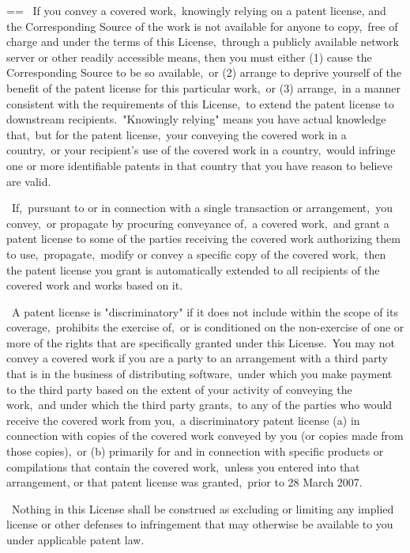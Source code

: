 \documentclass{book}
\makeatletter
\newenvironment{Texinfopreformatted}{%
  \par\GNUTobeylines\obeyspaces\frenchspacing\parskip=\z@\parindent=\z@}{}
{\catcode`\^^M=13 \gdef\GNUTobeylines{\catcode`\^^M=13 \def^^M{\null\par}}}
\newenvironment{Texinfoindented}{\begin{list}{}{}\item\relax}{\end{list}}
\renewcommand{\_}{\Texinfounderscore\discretionary{}{}{}}
\makeatother
\begin{document}
\begin{Texinfoindented}
\begin{Texinfopreformatted}
\  If you convey a covered work,\ knowingly relying on a patent license,
and the Corresponding Source of the work is not available for anyone
to copy,\ free of charge and under the terms of this License,\ through a
publicly available network server or other readily accessible means,
then you must either (1) cause the Corresponding Source to be so
available,\ or (2) arrange to deprive yourself of the benefit of the
patent license for this particular work,\ or (3) arrange,\ in a manner
consistent with the requirements of this License,\ to extend the patent
license to downstream recipients.\  "Knowingly relying" means you have
actual knowledge that,\ but for the patent license,\ your conveying the
covered work in a country,\ or your recipient's use of the covered work
in a country,\ would infringe one or more identifiable patents in that
country that you have reason to believe are valid.

\  If,\ pursuant to or in connection with a single transaction or
arrangement,\ you convey,\ or propagate by procuring conveyance of,\ a
covered work,\ and grant a patent license to some of the parties
receiving the covered work authorizing them to use,\ propagate,\ modify
or convey a specific copy of the covered work,\ then the patent license
you grant is automatically extended to all recipients of the covered
work and works based on it.

\  A patent license is "discriminatory" if it does not include within
the scope of its coverage,\ prohibits the exercise of,\ or is
conditioned on the non-exercise of one or more of the rights that are
specifically granted under this License.\  You may not convey a covered
work if you are a party to an arrangement with a third party that is
in the business of distributing software,\ under which you make payment
to the third party based on the extent of your activity of conveying
the work,\ and under which the third party grants,\ to any of the
parties who would receive the covered work from you,\ a discriminatory
patent license (a) in connection with copies of the covered work
conveyed by you (or copies made from those copies),\ or (b) primarily
for and in connection with specific products or compilations that
contain the covered work,\ unless you entered into that arrangement,
or that patent license was granted,\ prior to 28 March 2007.

\  Nothing in this License shall be construed as excluding or limiting
any implied license or other defenses to infringement that may
otherwise be available to you under applicable patent law.


\end{Texinfopreformatted}
\end{Texinfoindented}
\end{document}
